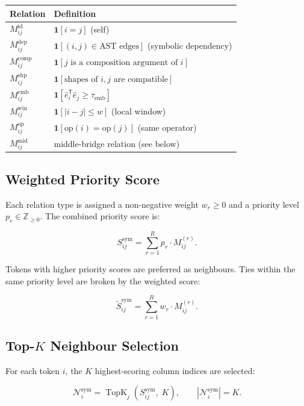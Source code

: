 \documentclass[11pt]{article}
\newcommand{\TopK}{\operatorname{TopK}}
\begin{document}
\medskip
\begin{center}
\begin{tabular}{lp{8cm}}
\toprule
Relation & Definition \\
\midrule
$M^{\text{id}}_{ij}$            & $\mathbf{1}[i=j]$ (self) \\
$M^{\text{dep}}_{ij}$           & $\mathbf{1}[(i,j) \in \text{AST edges}]$ (symbolic dependency) \\
$M^{\text{comp}}_{ij}$          & $\mathbf{1}[j \text{ is a composition argument of } i]$ \\
$M^{\text{shp}}_{ij}$           & $\mathbf{1}[\text{shapes of } i,j \text{ are compatible}]$ \\
$M^{\text{emb}}_{ij}$           & $\mathbf{1}[\hat{e}_i^{\mathsf{T}}\hat{e}_j \geq \tau_{\text{emb}}]$ \\
$M^{\text{win}}_{ij}$           & $\mathbf{1}[|i-j| \leq w]$ (local window) \\
$M^{\text{op}}_{ij}$            & $\mathbf{1}[\text{op}(i) = \text{op}(j)]$ (same operator) \\
$M^{\text{mid}}_{ij}$           & middle-bridge relation (see below) \\
\bottomrule
\end{tabular}
\end{center}

\subsection*{Weighted Priority Score}

Each relation type is assigned a non-negative weight $w_r \geq 0$
and a priority level $p_r \in \mathbb{Z}_{\geq 0}$.
The combined priority score is:

\[
S_{ij}^{\text{sym}}
= \sum_{r=1}^{R} p_r \cdot M^{(r)}_{ij}.
\]

Tokens with higher priority scores are preferred as neighbours.
Ties within the same priority level are broken by the weighted score:

\[
\tilde{S}_{ij}^{\text{sym}}
= \sum_{r=1}^{R} w_r \cdot M^{(r)}_{ij}.
\]

\subsection*{Top-$K$ Neighbour Selection}

For each token $i$, the $K$ highest-scoring column indices are selected:

\[
\mathcal{N}_i^{\text{sym}}
= \TopK_j\!\left(S_{ij}^{\text{sym}},\; K\right),
\qquad
|\mathcal{N}_i^{\text{sym}}| = K.
\]
\end{document}

